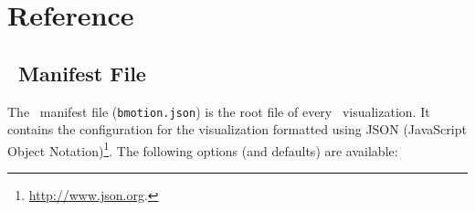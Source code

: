 \section{Reference}
\label{reference}

\subsection{\bms\ Manifest File}
\label{sec:manifest}

The \bms\ manifest file (\texttt{bmotion.json}) is the root file of every \bms\ visualization.
It contains the configuration for the visualization formatted using JSON (JavaScript Object Notation)\footnote{\url{http://www.json.org}.}.
The following options (and defaults) are available:

